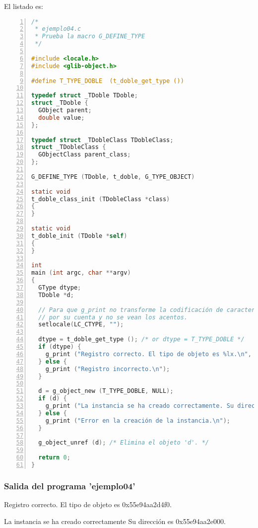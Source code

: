 El listado es:
\begin{lstlisting}[language=C, numbers=left]
/*
 * ejemplo04.c
 * Prueba la macro G_DEFINE_TYPE
 */

#include <locale.h>
#include <glib-object.h>

#define T_TYPE_DOBLE  (t_doble_get_type ())

typedef struct _TDoble TDoble;
struct _TDoble {
  GObject parent;
  double value;
};

typedef struct _TDobleClass TDobleClass;
struct _TDobleClass {
  GObjectClass parent_class;
};

G_DEFINE_TYPE (TDoble, t_doble, G_TYPE_OBJECT)

static void
t_doble_class_init (TDobleClass *class)
{
}

static void
t_doble_init (TDoble *self)
{
}

int
main (int argc, char **argv)
{
  GType dtype;
  TDoble *d;

  // Para que g_print no transforme la codificación de caracteres
  // por su cuenta y no se vean los acentos.
  setlocale(LC_CTYPE, "");
  
  dtype = t_doble_get_type (); /* or dtype = T_TYPE_DOBLE */
  if (dtype) {
    g_print ("Registro correcto. El tipo de objeto es %lx.\n", dtype);
  } else {
    g_print ("Registro incorrecto.\n");
  }

  d = g_object_new (T_TYPE_DOBLE, NULL);
  if (d) {
    g_print ("La instancia se ha creado correctamente. Su dirección ess %p.\n", d);
  } else {
    g_print ("Error en la creación de la instancia.\n");
  }

  g_object_unref (d); /* Elimina el objeto 'd'. */

  return 0;
}
\end{lstlisting}

 \subsubsection{Salida del programa 'ejemplo04'}
\textsf{Registro correcto. El tipo de objeto es 0x55e94aa2d4f0.}\par
\textsf{La instancia se ha creado correctamente Su dirección es 0x55e94aa2e000.}\par

